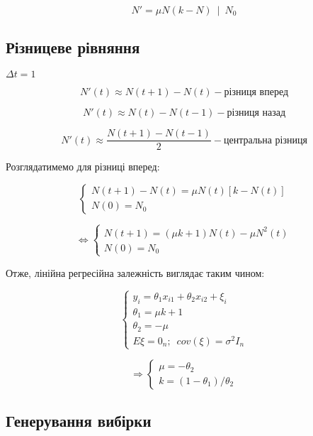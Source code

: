 \documentclass[11pt]{article}
\begin{document}
\[ N'=μN(k-N) \enspace | \enspace N_0 \]

    \subsection{Різницеве
рівняння}\label{ux440ux456ux437ux43dux438ux446ux435ux432ux435-ux440ux456ux432ux43dux44fux43dux43dux44f}

$ \Delta t = 1 $

\[ N'(t) \approx N(t+1)-N(t) - \text{різниця вперед} \]

\[ N'(t) \approx N(t)-N(t-1) - \text{різниця назад} \]

\[ N'(t) \approx \frac{N(t+1)-N(t-1)}{2}  - \text{центральна різниця} \]

Розглядатимемо для різниці вперед:

\[ \left \{ \begin{array}{ll}
                        N(t+1)-N(t)=\mu N(t)[k-N(t)] \\
                        N(0) = N_0
                       \end{array} \right. \]

\[ \iff \left \{ \begin{array}{ll}
                    N(t+1)=(\mu k+1)N(t)-\mu N^2(t) \\
                    N(0) = N_0
                \end{array} \right. \]


Отже, лінійна регресійна залежність виглядає таким чином:

\[ \left \{ \begin{array}{ll}
                  y_i = \theta_1 x_{i1} +  \theta_2 x_{i2} + \xi_i\\
                  \theta_1 = \mu k+1\\
                  \theta_2 = -\mu\\
                  E\xi = 0_n;\enspace cov(\xi) = \sigma^2I_n
                \end{array}
            \right. \]

              
\[ \Rightarrow \left \{ \begin{array}{ll}  
                  \mu = -\theta_2 \\
                  k = (1 - \theta_1) / \theta_2
                \end{array} \right. \]

    \subsection{Генерування
вибірки}\label{ux433ux435ux43dux435ux440ux443ux432ux430ux43dux43dux44f-ux432ux438ux431ux456ux440ux43aux438}
\end{document}
